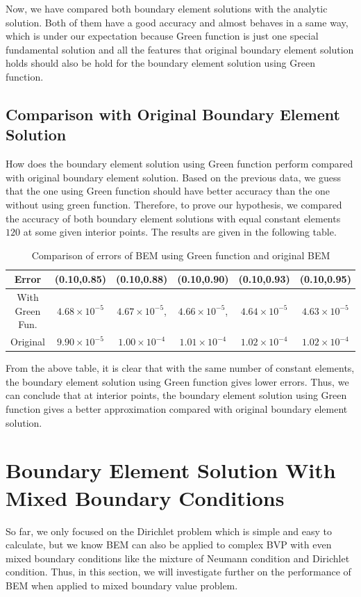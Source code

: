 \documentclass[a4paper,12pt]{article}
\begin{document}
\par Now, we have compared both boundary element solutions with the analytic solution. Both of them have a good accuracy and almost behaves in a same way, which is under our expectation because Green function is just one special fundamental solution and all the features that original boundary element solution holds should also be hold for the boundary element solution using Green function.  

\subsection{Comparison with Original Boundary Element Solution}
How does the boundary element solution using Green function perform compared with original boundary element solution. Based on the previous data, we guess that the one using Green function should have better accuracy than the one without using green function. Therefore, to prove our hypothesis, we compared the accuracy of both boundary element solutions with equal constant elements $120$ at some given interior points. The results are given in the following table. 

\begin{table}[H]
\centering
\begin{tabular}{@{}cccccc@{}}
\toprule
Error                  & (0.10,0.85)  & (0.10,0.88)   & (0.10,0.90)   & (0.10,0.93)  & (0.10,0.95)  \\ \midrule
With Green Fun.  & $4.68 \times 10^{-5}$ &$4.67 \times 10^{-5}$, & $4.66 \times 10^{-5}$, & $4.64 \times 10^{-5}$ & $4.63 \times 10^{-5}$ \\
Original & $9.90 \times 10^{-5}$ & $1.00 \times 10^{-4}$  & $1.01 \times 10^{-4}$   & $1.02  \times 10^{-4}$ & $1.02 \times 10^{-4}$  \\ \bottomrule
\end{tabular}
\caption{Comparison of errors of BEM using Green function and original BEM}
\label{tab:my-table}
\end{table}

From the above table, it is clear that with the same number of constant elements, the boundary element solution using Green function gives lower errors. Thus, we can conclude that at interior points, the boundary element solution using Green function gives a better approximation compared with original boundary element solution. 

\section{Boundary Element Solution With Mixed Boundary Conditions}
So far, we only focused on the Dirichlet problem which is simple and easy to calculate, but we know BEM can also be applied to complex BVP with even mixed boundary conditions like the mixture of Neumann condition and Dirichlet condition. Thus, in this section, we will investigate further on the performance of BEM when applied to mixed boundary value problem.
\end{document}

